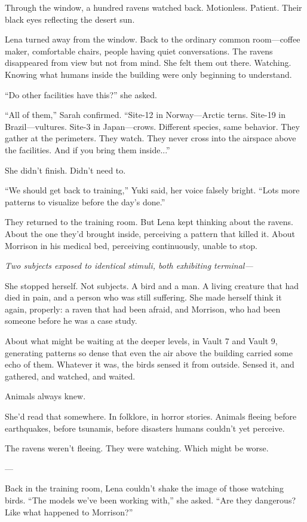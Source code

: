 Through the window, a hundred ravens watched back. Motionless. Patient. Their black eyes reflecting the desert sun.

Lena turned away from the window. Back to the ordinary common room—coffee maker, comfortable chairs, people having quiet conversations. The ravens disappeared from view but not from mind. She felt them out there. Watching. Knowing what humans inside the building were only beginning to understand.

``Do other facilities have this?'' she asked.

``All of them,'' Sarah confirmed. ``Site-12 in Norway—Arctic terns. Site-19 in Brazil—vultures. Site-3 in Japan—crows. Different species, same behavior. They gather at the perimeters. They watch. They never cross into the airspace above the facilities. And if you bring them inside...''

She didn't finish. Didn't need to.

``We should get back to training,'' Yuki said, her voice falsely bright. ``Lots more patterns to visualize before the day's done.''

They returned to the training room. But Lena kept thinking about the ravens. About the one they'd brought inside, perceiving a pattern that killed it. About Morrison in his medical bed, perceiving continuously, unable to stop.

\textit{Two subjects exposed to identical stimuli, both exhibiting terminal—}

She stopped herself. Not subjects. A bird and a man. A living creature that had died in pain, and a person who was still suffering. She made herself think it again, properly: a raven that had been afraid, and Morrison, who had been someone before he was a case study.

About what might be waiting at the deeper levels, in Vault 7 and Vault 9, generating patterns so dense that even the air above the building carried some echo of them. Whatever it was, the birds sensed it from outside. Sensed it, and gathered, and watched, and waited.

Animals always knew.

She'd read that somewhere. In folklore, in horror stories. Animals fleeing before earthquakes, before tsunamis, before disasters humans couldn't yet perceive.

The ravens weren't fleeing. They were watching. Which might be worse.

---

Back in the training room, Lena couldn't shake the image of those watching birds. ``The models we've been working with,'' she asked. ``Are they dangerous? Like what happened to Morrison?''

